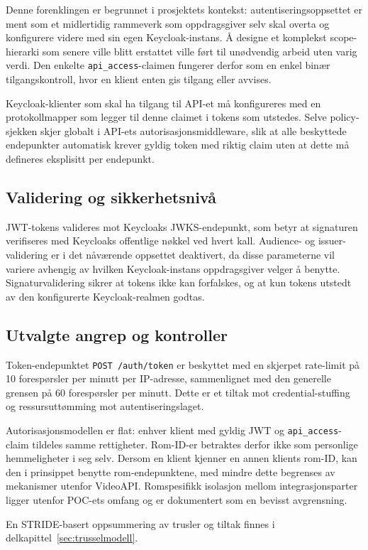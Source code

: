 Denne forenklingen er begrunnet i prosjektets kontekst: autentiseringsoppsettet er ment som et midlertidig rammeverk som oppdragsgiver selv skal overta og konfigurere videre med sin egen Keycloak-instans. Å designe et komplekst scope-hierarki som senere ville blitt erstattet ville ført til unødvendig arbeid uten varig verdi. Den enkelte \texttt{api\_access}-claimen fungerer derfor som en enkel binær tilgangskontroll, hvor en klient enten gis tilgang eller avvises.

Keycloak-klienter som skal ha tilgang til API-et må konfigureres med en protokollmapper som legger til denne claimet i tokens som utstedes. Selve policy-sjekken skjer globalt i API-ets autorisasjonsmiddleware, slik at alle beskyttede endepunkter automatisk krever gyldig token med riktig claim uten at dette må defineres eksplisitt per endepunkt.

\subsection{Validering og sikkerhetsnivå}

JWT-tokens valideres mot Keycloaks JWKS-endepunkt, som betyr at signaturen verifiseres med Keycloaks offentlige nøkkel ved hvert kall. Audience- og issuer-validering er i det nåværende oppsettet deaktivert, da disse parameterne vil variere avhengig av hvilken Keycloak-instans oppdragsgiver velger å benytte. Signaturvalidering sikrer at tokens ikke kan forfalskes, og at kun tokens utstedt av den konfigurerte Keycloak-realmen godtas.

\subsection{Utvalgte angrep og kontroller}

Token-endepunktet \texttt{POST /auth/token} er beskyttet med en skjerpet
rate-limit på 10 forespørsler per minutt per IP-adresse, sammenlignet med
den generelle grensen på 60 forespørsler per minutt. Dette er et tiltak
mot credential-stuffing og ressursuttømming mot autentiseringslaget.


Autorisasjonsmodellen er flat: enhver klient med gyldig JWT og \texttt{api\_access}-claim tildeles samme rettigheter. Rom-ID-er betraktes derfor ikke som personlige hemmeligheter i seg selv. Dersom en klient kjenner en annen klients rom-ID, kan den i prinsippet benytte rom-endepunktene, med mindre dette begrenses av mekanismer utenfor VideoAPI. Romspesifikk isolasjon mellom integrasjonsparter ligger utenfor POC-ets omfang og er dokumentert som en bevisst avgrensning.

En STRIDE-basert oppsummering av trusler og tiltak finnes i
delkapittel~\ref{sec:trusselmodell}.